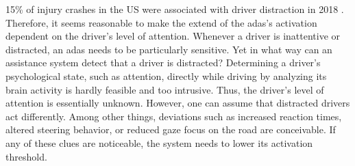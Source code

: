 
15\% of injury crashes in the US were associated with driver distraction in 2018 \parencite{distracted_nhtsa}. Therefore, it seems reasonable to make the extend of the \gls{adas}'s activation dependent on the driver's level of attention. Whenever a driver is inattentive or distracted, an \gls{adas} needs to be particularly sensitive. Yet in what way can an assistance system detect that a driver is distracted? Determining a driver's psychological state, such as attention, directly while driving by analyzing its brain activity is hardly feasible and too intrusive. Thus, the driver's level of attention is essentially unknown. However, one can assume that distracted drivers act differently. Among other things, deviations such as increased reaction times, altered steering behavior, or reduced gaze focus on the road are conceivable. If any of these clues are noticeable, the system needs to lower its activation threshold. 



